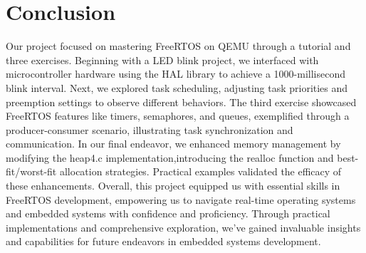 \section{Conclusion}

Our project focused on mastering FreeRTOS on QEMU through a tutorial and three exercises. 
Beginning with a LED blink project, we interfaced with microcontroller hardware using the HAL library to achieve a 1000-millisecond blink interval.
Next, we explored task scheduling, adjusting task priorities and preemption settings to observe different behaviors. 
The third exercise showcased FreeRTOS features like timers, semaphores, and queues, exemplified through a producer-consumer scenario, illustrating task synchronization and communication. 
In our final endeavor, we enhanced memory management by modifying the heap4.c implementation,introducing the realloc function and best-fit/worst-fit allocation strategies. 
Practical examples validated the efficacy of these enhancements. Overall, this project equipped us with essential skills in FreeRTOS development, empowering us to navigate real-time operating systems and embedded systems with confidence and proficiency.
Through practical implementations and comprehensive exploration, we've gained invaluable insights and capabilities for future endeavors in embedded systems development.
